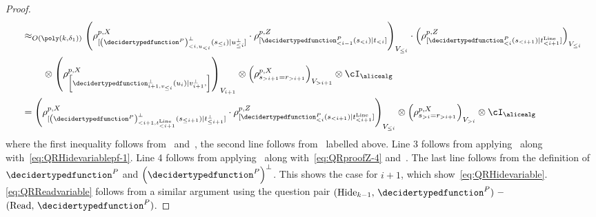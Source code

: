 \begin{proof}
{\begin{align*}
		&\approx_{O(\poly(k, \delta_1))}  \left(\rho^{p,X}_{[\left(\decidertypedfunction^P\right)^{\bot}_{< i, u_{< i}}(s_{\leq i})| u^{\bot}_{\leq i}]} \cdot \rho^{p,Z}_{[\decidertypedfunction^P_{< i-1}(s_{< i})| t_{< i}]}\right)_{V_{\leq i}} \cdot \left(\rho^{p,Z}_{[\decidertypedfunction^P_{< i}(s_{< i+1})| t_{< i+1}^{\text{Line}}]}\right)_{V_{\leq i}}  \\
		&\qquad \, \otimes \left(\rho^{p,X}_{\left[ \decidertypedfunction^{\bot}_{i+1, v_{\leq i} } (u_{i})| v_{i+1}^{\bot}, \right]}\right)_{V_{i+1}} \otimes \left(\rho^{p,X}_{s_{> i+1} = r_{> i+1} } \right)_{V_{> i +1}} \otimes \cI_{\alicealg} \\
		&= \left(\rho^{p,X}_{[\left(\decidertypedfunction^P\right)^{\bot}_{< i+1, t^{\text{Line}}_{< i+1}}(s_{\leq i+1})| t^{\bot}_{\leq i+1}]} \cdot \rho^{p,Z}_{[\decidertypedfunction^P_{< i}(s_{< i+1})| t_{< i+1}^{\text{Line}}]}\right)_{V_{\leq i}} \otimes  \left(\rho^{p,X}_{s_{> i} = r_{> i+1} }\right)_{V_{> i}} \otimes \cI_{\alicealg}
	\end{align*}
}
	where the first inequality follows from~ and~, the second line follows from~ labelled above. Line 3 follows from applying~ along with~\eqref{eq:QRHidevariablepf-1}. Line 4 follows from applying~ along with~\eqref{eq:QRproofZ-4} and~. The last line follows from the definition of $\decidertypedfunction^P$ and $\left(\decidertypedfunction^P\right)^{\bot}$. This shows the case for $i+1$, which show~\eqref{eq:QRHidevariable}. \eqref{eq:QRReadvariable} follows from a similar argument using the question pair $(\text{Hide}_{k-1}, \,\decidertypedfunction^{P})$ \textbf{--} $(\text{Read}, \,\decidertypedfunction^{P})$. 
\end{proof}


